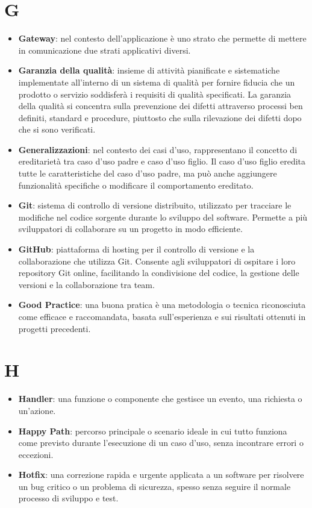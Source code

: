\documentclass[a4paper,12pt]{article}
\begin{document}
\section{G}
\begin{itemize}
    \item \textbf{Gateway}: nel contesto dell'applicazione è uno strato che permette di mettere in comunicazione due strati applicativi diversi. 
    \item \textbf{Garanzia della qualità}: insieme di attività pianificate e sistematiche implementate all'interno di un sistema di qualità per fornire fiducia che un prodotto o servizio soddisferà i requisiti di qualità specificati. La garanzia della qualità si concentra sulla prevenzione dei difetti attraverso processi ben definiti, standard e procedure, piuttosto che sulla rilevazione dei difetti dopo che si sono verificati.
    \item \textbf{Generalizzazioni}: nel contesto dei casi d'uso, rappresentano il concetto di ereditarietà tra caso d'uso padre e caso d'uso figlio. Il caso d'uso figlio eredita tutte le caratteristiche del caso d'uso padre, ma può anche aggiungere funzionalità specifiche o modificare il comportamento ereditato.
    \item \textbf{Git}: sistema di controllo di versione distribuito, utilizzato per tracciare le modifiche nel codice sorgente durante lo sviluppo del software. Permette a più sviluppatori di collaborare su un progetto in modo efficiente.
    \item \textbf{GitHub}: piattaforma di hosting per il controllo di versione e la collaborazione che utilizza Git. Consente agli sviluppatori di ospitare i loro repository Git online, facilitando la condivisione del codice, la gestione delle versioni e la collaborazione tra team.
    \item \textbf{Good Practice}: una buona pratica è una metodologia o tecnica riconosciuta come efficace e raccomandata, basata sull'esperienza e sui risultati ottenuti in progetti precedenti.
\end{itemize}
\section{H}
\begin{itemize}
    \item \textbf{Handler}: una funzione o componente che gestisce un evento, una richiesta o un’azione.
    \item \textbf{Happy Path}: percorso principale o scenario ideale in cui tutto funziona come previsto durante l'esecuzione di un caso d'uso, senza incontrare errori o eccezioni.
    \item \textbf{Hotfix}: una correzione rapida e urgente applicata a un software per risolvere un bug critico o un problema di sicurezza, spesso senza seguire il normale processo di sviluppo e test.
\end{itemize}
\end{document}
